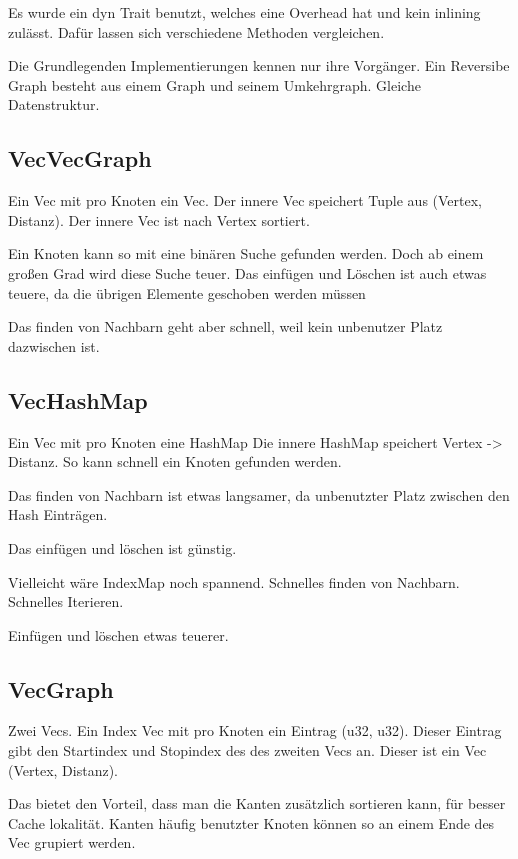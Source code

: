 Es wurde ein dyn Trait benutzt, welches eine Overhead hat und kein inlining zulässt.
Dafür lassen sich verschiedene Methoden vergleichen.

Die Grundlegenden Implementierungen kennen nur ihre Vorgänger.
Ein Reversibe Graph besteht aus einem Graph und seinem Umkehrgraph.
Gleiche Datenstruktur.

\subsection{VecVecGraph}
Ein Vec mit pro Knoten ein Vec.
Der innere Vec speichert Tuple aus (Vertex, Distanz).
Der innere Vec ist nach Vertex sortiert.

Ein Knoten kann so mit eine binären Suche gefunden werden.
Doch ab einem großen Grad wird diese Suche teuer.
Das einfügen und Löschen ist auch etwas teuere, da die übrigen Elemente geschoben werden müssen

Das finden von Nachbarn geht aber schnell, weil kein unbenutzer Platz dazwischen ist.

\subsection{VecHashMap}
Ein Vec mit pro Knoten eine HashMap
Die innere HashMap speichert Vertex -> Distanz.
So kann schnell ein Knoten gefunden werden.

Das finden von Nachbarn ist etwas langsamer, da unbenutzter Platz zwischen den Hash Einträgen.

Das einfügen und löschen ist günstig.

Vielleicht wäre IndexMap noch spannend.
Schnelles finden von Nachbarn.
Schnelles Iterieren.

Einfügen und löschen etwas teuerer.

\subsection{VecGraph}
Zwei Vecs.
Ein Index Vec mit pro Knoten ein Eintrag (u32, u32).
Dieser Eintrag gibt den Startindex und Stopindex des des zweiten Vecs an.
Dieser ist ein Vec (Vertex, Distanz).

Das bietet den Vorteil, dass man die Kanten zusätzlich sortieren kann, für besser Cache lokalität.
Kanten häufig benutzter Knoten können so an einem Ende des Vec grupiert werden.